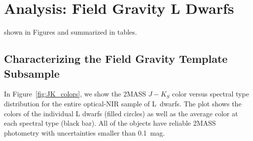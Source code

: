 \documentclass[12pt,preprint]{aastex}
\begin{document}

\clearpage
\section{Analysis: Field Gravity L Dwarfs}
\label{sec:fieldg}

shown in Figures and summarized in tables.




\subsection{Characterizing the Field Gravity Template Subsample}
\label{sec:templates_normal}

In Figure~\ref{fig:JK_colors}, we show the 2MASS $J-K_S$ color versus spectral type distribution for the entire optical-NIR sample of L~dwarfs. The plot shows the colors of the individual L dwarfs (filled circles) as well as the average color at each spectral type (black bar). All of the objects have reliable 2MASS photometry with uncertainties smaller than 0.1~mag. 
\end{document}
